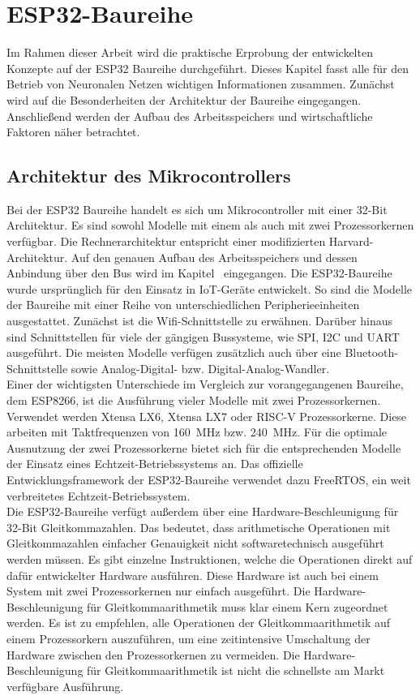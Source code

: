\section{ESP32-Baureihe}\label{sec:ESP32-Baureihe}
    Im Rahmen dieser Arbeit wird die praktische Erprobung der entwickelten Konzepte auf der ESP32 Baureihe durchgeführt. Dieses Kapitel fasst alle für den Betrieb von Neuronalen Netzen wichtigen Informationen zusammen. Zunächst wird auf die Besonderheiten der Architektur der Baureihe eingegangen. Anschließend werden der Aufbau des Arbeitsspeichers und wirtschaftliche Faktoren näher betrachtet.

\subsection{Architektur des Mikrocontrollers}
    Bei der ESP32 Baureihe handelt es sich um Mikrocontroller mit einer 32-Bit Architektur. Es sind sowohl Modelle mit einem als auch mit zwei Prozessorkernen verfügbar. Die Rechnerarchitektur entspricht einer modifizierten Harvard-Architektur. Auf den genauen Aufbau des Arbeitsspeichers und dessen Anbindung über den Bus wird im Kapitel~ eingegangen. Die ESP32-Baureihe wurde ursprünglich für den Einsatz in IoT-Geräte entwickelt. So sind die Modelle der Baureihe mit einer Reihe von unterschiedlichen Peripherieeinheiten ausgestattet. Zunächst ist die Wifi-Schnittstelle zu erwähnen. Darüber hinaus sind Schnittstellen für viele der gängigen Bussysteme, wie SPI, I2C und UART ausgeführt. Die meisten Modelle verfügen zusätzlich auch über eine Bluetooth-Schnittstelle sowie Analog-Digital- bzw. Digital-Analog-Wandler\cite{ESPCompare}\cite{ESP32}.\\ Einer der wichtigsten Unterschiede im Vergleich zur vorangegangenen Baureihe, dem ESP8266, ist die Ausführung vieler Modelle mit zwei Prozessorkernen. Verwendet werden Xtensa LX6, Xtensa LX7 oder RISC-V Prozessorkerne. Diese arbeiten mit Taktfrequenzen von \SI{160}{\mega\hertz} bzw. \SI{240}{\mega\hertz}. Für die optimale Ausnutzung der zwei Prozessorkerne bietet sich für die entsprechenden Modelle der Einsatz eines Echtzeit-Betriebssystems an. Das offizielle Entwicklungsframework der ESP32-Baureihe verwendet dazu FreeRTOS, ein weit verbreitetes Echtzeit-Betriebssystem\cite{Cameron2021}.\\ Die ESP32-Baureihe verfügt außerdem über eine Hardware-Beschleunigung für 32-Bit Gleitkommazahlen. Das bedeutet, dass arithmetische Operationen mit Gleitkommazahlen einfacher Genauigkeit nicht softwaretechnisch ausgeführt werden müssen. Es gibt einzelne Instruktionen, welche die Operationen direkt auf dafür entwickelter Hardware ausführen. Diese Hardware ist auch bei einem System mit zwei Prozessorkernen nur einfach ausgeführt. Die Hardware-Beschleunigung für Gleitkommaarithmetik muss klar einem Kern zugeordnet werden. Es ist zu empfehlen, alle Operationen der Gleitkommaarithmetik auf einem Prozessorkern auszuführen, um eine zeitintensive Umschaltung der Hardware zwischen den Prozessorkernen zu vermeiden. Die Hardware-Beschleunigung für Gleitkommaarithmetik ist nicht die schnellste am Markt verfügbare Ausführung\cite{ESPFloat}.

